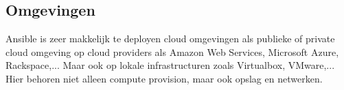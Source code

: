 \subsection{Omgevingen}
Ansible is zeer makkelijk te deployen cloud omgevingen als publieke of private cloud omgeving op cloud providers als Amazon Web Services, Microsoft Azure, Rackspace,... Maar ook op lokale infrastructuren zoals Virtualbox, VMware,... Hier behoren niet alleen  compute provision, maar ook opslag en netwerken.


